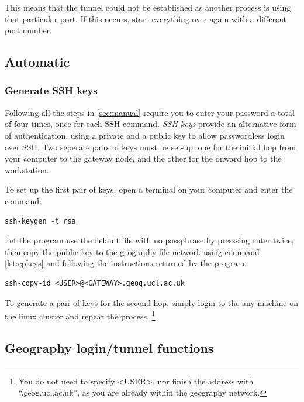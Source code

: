 \documentclass[a4paper]{article}
\begin{document}
This means that the tunnel could not be established as another process is using that particular port.
If this occurs, start everything over again with a different port number.

\subsection{Automatic}
\label{sec:auto}

\subsubsection{Generate SSH keys}
\label{sec:sshkeys}
Following all the steps in \ref{sec:manual} require you to enter your password a total of four times, once for each SSH command.
\href{https://wiki.archlinux.org/index.php/SSH_keys}{\emph{SSH keys}} provide an alternative form of authentication, using a private and a public key to allow passwordless login over SSH.
Two seperate pairs of keys must be set-up: one for the initial hop from your computer to the gateway node, and the other for the onward hop to the workstation.

To set up the first pair of keys, open a terminal on your computer and enter the command:
\begin{lstlisting}[caption={Generate SSH keys}, label={lst:genkeys}]
ssh-keygen -t rsa
\end{lstlisting}
Let the program use the default file with no passphrase by presssing enter twice, then copy the public key to the geography file network using command \ref{lst:cpkeys} and following the instructions returned by the program.

\begin{lstlisting}[caption={Copy public key to geography file system}, label={lst:cpkeys}]
ssh-copy-id <USER>@<GATEWAY>.geog.ucl.ac.uk
\end{lstlisting}

To generate a pair of keys for the second hop, simply login to the any machine on the linux cluster and repeat the process.
\footnote{You do not need to specify \textless{}USER\textgreater{}, nor finish the address with ``.geog.ucl.ac.uk'', as you are already within the geography network.}

\subsection{Geography login/tunnel functions}
\label{sec:gfuncs}
\end{document}

